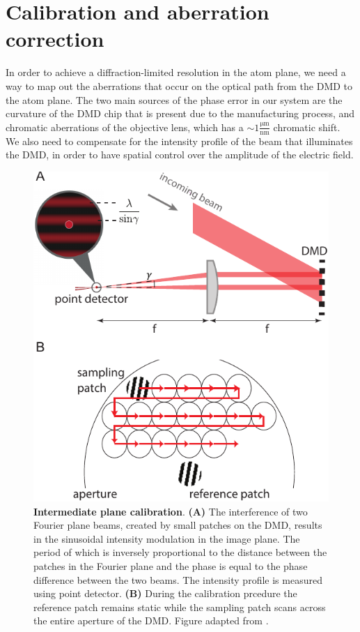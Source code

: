 \section{Calibration and aberration correction}
In order to achieve a diffraction-limited resolution in the atom plane, we need a way to map out the aberrations that occur on the optical path from the DMD to the atom plane. The two main sources of the phase error in our system are the curvature of the DMD chip that is present due to the manufacturing process, and chromatic aberrations of the objective lens, which has a $\sim 1 \frac{\mathrm{\mu m}}{\mathrm{nm}} $ chromatic shift. We also need to compensate for the intensity profile of the beam that illuminates the DMD, in order to have spatial control over the amplitude of the electric field.

\begin{figure}[t]
	\centering
	\includegraphics[scale=1]{figures/DMD_ipcal.pdf}
	\caption{{\bf Intermediate plane calibration}. {\bf (A)} The interference of two Fourier plane beams, created by small patches on the DMD, results in the sinusoidal intensity modulation in the image plane. The period of which is inversely proportional to the distance between the patches in the Fourier plane and the phase is equal to the phase difference between the two beams. The intensity profile is measured using point detector. {\bf (B)} During the calibration prcedure the reference patch remains static while the sampling patch scans across the entire aperture of the DMD. Figure adapted from \cite{Zupancic2016}.}
	\label{fig:DMD_cal_scheam}
\end{figure}

